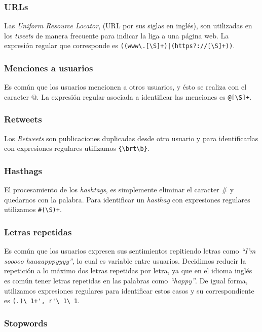 \documentclass[sigconf, nonacm, spanish]{acmart}
\begin{document}
\subsubsection{URLs}

Las \textit{Uniform Resource Locator}, (URL por sus siglas en inglés), son utilizadas en los \textit{tweets} de manera frecuente para indicar la liga a una página web. La expresión regular que corresponde es \verb$((www\.[\S]+)|(https?://[\S]+))$.

\subsubsection{Menciones a usuarios}

Es común que los usuarios mencionen a otros usuarios, y ésto se realiza con el caracter @. La expresión regular asociada a identificar las menciones es \verb$@[\S]+$.

\subsubsection{Retweets}

Los \textit{Retweets} son publicaciones duplicadas desde otro usuario y para identificarlas con expresiones regulares utilizamos \verb${\brt\b}$.

\subsubsection{Hasthags}

El procesamiento de los \textit{hashtags}, es simplemente eliminar el caracter \# y quedarnos con la palabra. Para identificar un \textit{hasthag} con expresiones regulares utilizamos \verb$#(\S)+$.

\subsubsection{Letras repetidas}

Es común que los usuarios expresen sus sentimientos repitiendo letras como \textit{``I'm sooooo haaaapppyyyy''}, lo cual es variable entre usuarios. Decidimos reducir la repetición a lo máximo dos letras repetidas por letra, ya que en el idioma inglés es común tener letras repetidas en las palabras como \textit{``happy''}. De igual forma, utilizamos expresiones regulares para identificar estos casos y su correspondiente es \verb$(.)\ 1+', r'\ 1\ 1$.

\subsubsection{Stopwords}
\end{document}
